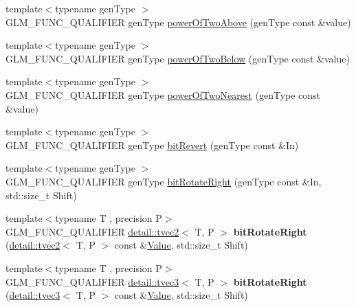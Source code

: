 \begin{DoxyCompactItemize}
\item 
{\footnotesize template$<$typename gen\+Type $>$ }\\G\+L\+M\+\_\+\+F\+U\+N\+C\+\_\+\+Q\+U\+A\+L\+I\+F\+I\+ER gen\+Type \hyperlink{group__gtx__bit_gaa49786cf3f8a1f65de6e70b6088a811e}{power\+Of\+Two\+Above} (gen\+Type const \&value)
\item 
{\footnotesize template$<$typename gen\+Type $>$ }\\G\+L\+M\+\_\+\+F\+U\+N\+C\+\_\+\+Q\+U\+A\+L\+I\+F\+I\+ER gen\+Type \hyperlink{group__gtx__bit_gaeceaea338213cbff7a275460e35e8d0c}{power\+Of\+Two\+Below} (gen\+Type const \&value)
\item 
{\footnotesize template$<$typename gen\+Type $>$ }\\G\+L\+M\+\_\+\+F\+U\+N\+C\+\_\+\+Q\+U\+A\+L\+I\+F\+I\+ER gen\+Type \hyperlink{group__gtx__bit_ga9e68299f4ca0cd6674efbee62d425b95}{power\+Of\+Two\+Nearest} (gen\+Type const \&value)
\item 
{\footnotesize template$<$typename gen\+Type $>$ }\\G\+L\+M\+\_\+\+F\+U\+N\+C\+\_\+\+Q\+U\+A\+L\+I\+F\+I\+ER gen\+Type \hyperlink{group__gtx__bit_ga2d3939fbf96aa54cb2fd3461a60aba02}{bit\+Revert} (gen\+Type const \&In)
\item 
{\footnotesize template$<$typename gen\+Type $>$ }\\G\+L\+M\+\_\+\+F\+U\+N\+C\+\_\+\+Q\+U\+A\+L\+I\+F\+I\+ER gen\+Type \hyperlink{group__gtx__bit_gaf999dbfe97a5be5ea68841a58cf89a4a}{bit\+Rotate\+Right} (gen\+Type const \&In, std\+::size\+\_\+t Shift)
\item 
{\footnotesize template$<$typename T , precision P$>$ }\\G\+L\+M\+\_\+\+F\+U\+N\+C\+\_\+\+Q\+U\+A\+L\+I\+F\+I\+ER \hyperlink{structglm_1_1detail_1_1tvec2}{detail\+::tvec2}$<$ T, P $>$ {\bfseries bit\+Rotate\+Right} (\hyperlink{structglm_1_1detail_1_1tvec2}{detail\+::tvec2}$<$ T, P $>$ const \&\hyperlink{document_8h_a071cf97155ba72ac9a1fc4ad7e63d481}{Value}, std\+::size\+\_\+t Shift)\hypertarget{namespaceglm_ad95103bee42199639a722beef3c98538}{}\label{namespaceglm_ad95103bee42199639a722beef3c98538}

\item 
{\footnotesize template$<$typename T , precision P$>$ }\\G\+L\+M\+\_\+\+F\+U\+N\+C\+\_\+\+Q\+U\+A\+L\+I\+F\+I\+ER \hyperlink{structglm_1_1detail_1_1tvec3}{detail\+::tvec3}$<$ T, P $>$ {\bfseries bit\+Rotate\+Right} (\hyperlink{structglm_1_1detail_1_1tvec3}{detail\+::tvec3}$<$ T, P $>$ const \&\hyperlink{document_8h_a071cf97155ba72ac9a1fc4ad7e63d481}{Value}, std\+::size\+\_\+t Shift)\hypertarget{namespaceglm_acd2e2cfc11667479cf8c279667cfb162}{}\label{namespaceglm_acd2e2cfc11667479cf8c279667cfb162}


\end{DoxyCompactItemize}
